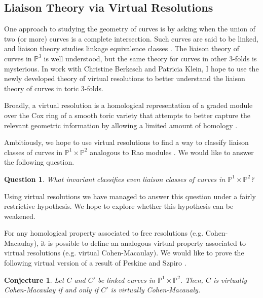 \documentclass[11pt,reqno]{amsart}
\newtheorem{conj}[lemma]{Conjecture}
\newtheorem{question}[lemma]{Question}
\theoremstyle{remark}
\renewcommand{\P}{\mathbb{P}}
\begin{document}
\subsection{Liaison Theory via Virtual Resolutions}

One approach to studying the geometry of curves is by asking when the union of two (or more) curves is a complete intersection. Such curves are said to be linked, and liaison theory studies linkage equivalence classes \cite{peskineSzpiro74, huneke84, hunekeUlrich87, hunekeUlrich88}. The liaison theory of curves in $\P^3$ is well understood, but the same theory for curves in other 3-folds is mysterious. In work with Christine Berkesch and Patricia Klein, I hope to use the newly developed theory of virtual resolutions to better understand the liaison theory of curves in toric 3-folds. 

Broadly, a virtual resolution is a homological representation of a graded module over the Cox ring of a smooth toric variety that attempts to better capture the relevant geometric information by allowing a limited amount of homology \cite{berkeschErmanSmith17}. 


Ambitiously, we hope to use virtual resolutions to find a way to classify liaison classes of curves in $\P^1\times\P^2$ analogous to Rao modules \cite{rao78}. We would like to answer the following question. 
 
\begin{question}\label{quest:virtual-rao}
What invariant classifies even liaison classes of curves in $\P^1\times\P^2$?
\end{question}

Using virtual resolutions we have managed to answer this question under a fairly restrictive hypothesis. We hope to explore whether this hypothesis can be weakened. 

For any homological property associated to free resolutions (e.g. Cohen-Macaulay), it is possible to define an analogous virtual property associated to virtual resolutions (e.g. virtual Cohen-Macaulay). We would like to prove the following virtual version of a result of Peskine and Szpiro \cite{peskineSzpiro74}. 

\begin{conj}\label{goalTheorem:virtualACM}
Let $C$ and $C'$ be linked curves in $\P^1\times\P^2$. Then, $C$ is virtually Cohen-Macaulay if and only if $C'$ is virtually Cohen-Macaualy.
\end{conj}
\end{document}
